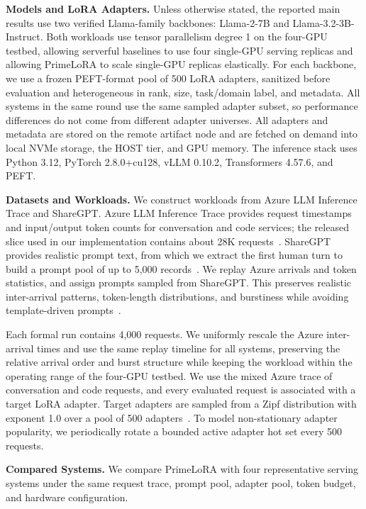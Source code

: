 \documentclass[lettersize,journal]{IEEEtran}
\begin{document}
\textbf{Models and LoRA Adapters.}
Unless otherwise stated, the reported main results use two verified Llama-family backbones: Llama-2-7B and Llama-3.2-3B-Instruct. Both workloads use tensor parallelism degree 1 on the four-GPU testbed, allowing serverful baselines to use four single-GPU serving replicas and allowing PrimeLoRA to scale single-GPU replicas elastically. For each backbone, we use a frozen PEFT-format pool of 500 LoRA adapters, sanitized before evaluation and heterogeneous in rank, size, task/domain label, and metadata. All systems in the same round use the same sampled adapter subset, so performance differences do not come from different adapter universes. All adapters and metadata are stored on the remote artifact node and are fetched on demand into local NVMe storage, the HOST tier, and GPU memory. The inference stack uses Python 3.12, PyTorch 2.8.0+cu128, vLLM 0.10.2, Transformers 4.57.6, and PEFT.

\textbf{Datasets and Workloads.}
We construct workloads from Azure LLM Inference Trace and ShareGPT. Azure LLM Inference Trace provides request timestamps and input/output token counts for conversation and code services; the released slice used in our implementation contains about 28K requests~\cite{DynamoLLM}. ShareGPT provides realistic prompt text, from which we extract the first human turn to build a prompt pool of up to 5,000 records~\cite{EfficientLLMScheduling}. We replay Azure arrivals and token statistics, and assign prompts sampled from ShareGPT. This preserves realistic inter-arrival patterns, token-length distributions, and burstiness while avoiding template-driven prompts~\cite{BurstGPT}.

Each formal run contains 4,000 requests. We uniformly rescale the Azure inter-arrival times and use the same replay timeline for all systems, preserving the relative arrival order and burst structure while keeping the workload within the operating range of the four-GPU testbed. We use the mixed Azure trace of conversation and code requests, and every evaluated request is associated with a target LoRA adapter. Target adapters are sampled from a Zipf distribution with exponent 1.0 over a pool of 500 adapters~\cite{Punica}. To model non-stationary adapter popularity, we periodically rotate a bounded active adapter hot set every 500 requests.

\textbf{Compared Systems.}
We compare PrimeLoRA with four representative serving systems under the same request trace, prompt pool, adapter pool, token budget, and hardware configuration.
\end{document}
